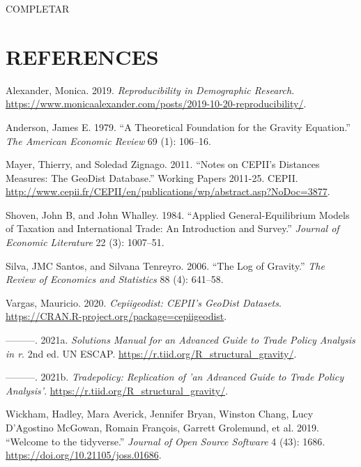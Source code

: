 \documentclass[12pt,reqno,oneside,pdftex]{formato-puc/puctesis} %
\newenvironment{CSLReferences}
  {}
  {\par}
\begin{document}
COMPLETAR

\chapter*{REFERENCES}

\hypertarget{refs}{}
\begin{CSLReferences}{1}{0}
\leavevmode\hypertarget{ref-malexander19}{}%
Alexander, Monica. 2019. \emph{Reproducibility in Demographic Research}.
\url{https://www.monicaalexander.com/posts/2019-10-20-reproducibility/}.

\leavevmode\hypertarget{ref-anderson1979theoretical}{}%
Anderson, James E. 1979. {``A Theoretical Foundation for the Gravity
Equation.''} \emph{The American Economic Review} 69 (1): 106--16.

\leavevmode\hypertarget{ref-CEPII201125}{}%
Mayer, Thierry, and Soledad Zignago. 2011. {``Notes on CEPII's Distances
Measures: The GeoDist Database.''} Working Papers 2011-25. CEPII.
\url{http://www.cepii.fr/CEPII/en/publications/wp/abstract.asp?NoDoc=3877}.

\leavevmode\hypertarget{ref-shoven1984applied}{}%
Shoven, John B, and John Whalley. 1984. {``Applied General-Equilibrium
Models of Taxation and International Trade: An Introduction and
Survey.''} \emph{Journal of Economic Literature} 22 (3): 1007--51.

\leavevmode\hypertarget{ref-silva2006log}{}%
Silva, JMC Santos, and Silvana Tenreyro. 2006. {``The Log of Gravity.''}
\emph{The Review of Economics and Statistics} 88 (4): 641--58.

\leavevmode\hypertarget{ref-cepiigeodist}{}%
Vargas, Mauricio. 2020. \emph{Cepiigeodist: CEPII's GeoDist Datasets}.
\url{https://CRAN.R-project.org/package=cepiigeodist}.

\leavevmode\hypertarget{ref-solutionsagtpa}{}%
---------. 2021a. \emph{Solutions Manual for an Advanced Guide to Trade
Policy Analysis in r}. 2nd ed. UN ESCAP.
\url{https://r.tiid.org/R_structural_gravity/}.

\leavevmode\hypertarget{ref-tradepolicy}{}%
---------. 2021b. \emph{Tradepolicy: Replication of 'an Advanced Guide
to Trade Policy Analysis'}.
\url{https://r.tiid.org/R_structural_gravity/}.

\leavevmode\hypertarget{ref-tidyverse}{}%
Wickham, Hadley, Mara Averick, Jennifer Bryan, Winston Chang, Lucy
D'Agostino McGowan, Romain François, Garrett Grolemund, et al. 2019.
{``Welcome to the {tidyverse}.''} \emph{Journal of Open Source Software}
4 (43): 1686. \url{https://doi.org/10.21105/joss.01686}.


\end{CSLReferences}
\end{document}
